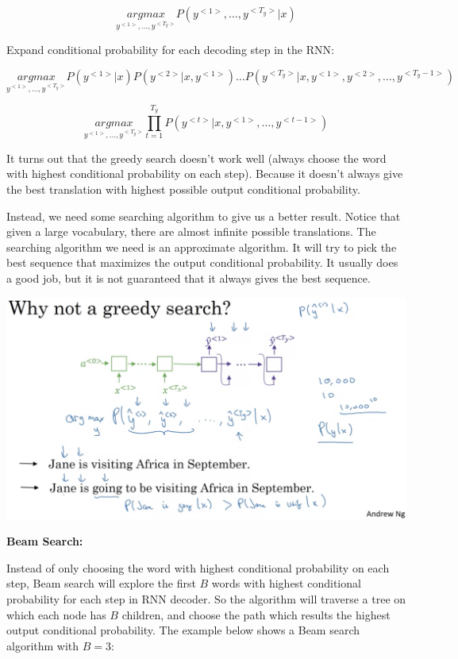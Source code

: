 \documentclass{article}
\begin{document}
\[\underset{y^{<1>}, \dots, y^{<T_{y}>}}{argmax} P(y^{<1>}, \dots, y^{<T_{y}>} | x)\]

\noindent Expand conditional probability for each decoding step in the RNN:

\[\underset{y^{<1>}, \dots, y^{<T_{y}>}}{argmax} P(y^{<1>} | x) P(y^{<2>} | x, y^{<1>}) \dots P(y^{<T_{y}>} | x, y^{<1>}, y^{<2>}, \dots, y^{<T_{y} - 1>})\]

\[\underset{y^{<1>}, \dots, y^{<T_{y}>}}{argmax} \prod_{t = 1}^{T_{y}} P(y^{<t>} | x, y^{<1>}, \dots, y^{<t - 1>})\]

\noindent It turns out that the greedy search doesn't work well (always choose the word with highest conditional probability on each step). Because it doesn't always give the best translation with highest possible output conditional probability.

\bigskip

\noindent Instead, we need some searching algorithm to give us a better result. Notice that given a large vocabulary, there are almost infinite possible translations. The searching algorithm we need is an approximate algorithm. It will try to pick the best sequence that maximizes the output conditional probability. It usually does a good job, but it is not guaranteed that it always gives the best sequence.

\begin{center}
\includegraphics[scale=0.3]{./images/pick_most_likely_sequence.png}
\end{center}

\noindent \textbf{Beam Search:}

\noindent Instead of only choosing the word with highest conditional probability on each step, Beam search will explore the first \(B\) words with highest conditional probability for each step in RNN decoder. So the algorithm will traverse a tree on which each node has \(B\) children, and choose the path which results the highest output conditional probability. The example below shows a Beam search algorithm with \(B = 3\):
\end{document}
